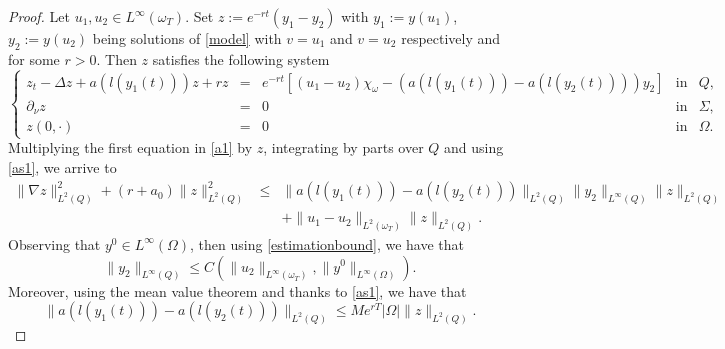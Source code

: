 \documentclass[reqno,twoside]{amsart}
\numberwithin{equation}{section}
\theoremstyle{definition}
\numberwithin{equation}{section}
\def \dis {\displaystyle}
\begin{document}
\begin{proof}
Let $u_1,u_2\in L^\infty(\omega_T) .$
Set $z:=e^{-rt}(y_1-y_2)$ with  $y_1:=y(u_1)$, $y_2:=y(u_2)$ being solutions of \eqref{model} with $v=u_1$ and $v=u_2$ respectively and for some $r>0$. Then $z$ satisfies the following system
\begin{equation}\label{a1}
	\left\{
	\begin{array}{rllll}
		\dis z_{t}-\Delta z+a\left(l(y_1(t))\right)z+rz &=&e^{-rt}\left[(u_1-u_2)\chi_{\omega}- (a\left(l(y_1(t))\right)-a\left(l(y_2(t))\right))y_2\right]& \mbox{in}& Q,\\
		\dis  \partial_\nu z&=&0& \mbox{in}& \Sigma, \\
		\dis  z(0,\cdot)&=&0 &\mbox{in}&\Omega.
	\end{array}
	\right.
\end{equation}
Multiplying the first equation in \eqref{a1} by $z$, integrating by parts over $Q$ and using \eqref{as1}, we arrive to
\begin{equation}\label{ajout0}
	\begin{array}{rllll}
		\|\nabla z\|^2_{L^2(Q)}+ (r+a_0)\|z\|^2_{L^2(Q)} &\leq& \|a(l(y_1(t)))-a(l(y_2(t)))\|_{L^2(Q)}\|y_2\|_{L^\infty(Q)}\|z\|_{L^2(Q)}\\
		&&+ \|u_1-u_2\|_{L^2(\omega_T)}\|z\|_{L^2(Q)}.
	\end{array}
\end{equation}
Observing that $y^0\in L^\infty(\Omega)$, then using \eqref{estimationbound}, we have that
\begin{equation}\label{ajout4}
	\|y_2\|_{L^\infty(Q)}\leq C(\|u_2\|_{L^\infty(\omega_T)}, \|y^0\|_{L^\infty(\Omega)}).
\end{equation}
Moreover, using the mean value theorem and thanks to  \eqref{as1}, we have that
\begin{equation}\label{ajout1}
	\| a\left(l(y_1(t))\right)-a\left(l(y_2(t))\right)\|_{L^2(Q)}\leq Me^{rT}|\Omega|\|z\|_{L^2(Q)}.
\end{equation}


\end{proof}
\end{document}
